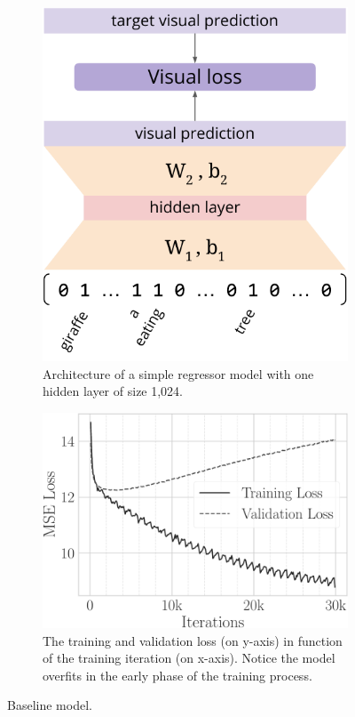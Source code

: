 \begin{figure}
\begin{subfigure}{0.37\textwidth}
\includegraphics[width=\linewidth]{visreg-arch}
\caption{Architecture of a simple regressor model with one hidden layer of size 1,024.}
\label{fig:t2v:visreg:arch}
\end{subfigure}
\hfill
\begin{subfigure}{0.55\textwidth}
\includegraphics[width=\linewidth]{visreg-loss}
\caption{The training and validation loss (on y-axis) in function of the training iteration (on x-axis).
Notice the model overfits in the early phase of the training process.}
\label{fig:t2v:visreg:loss}
\end{subfigure}
\caption{Baseline \visreg{} model.}
\label{fig:t2v:visreg}
\end{figure}

